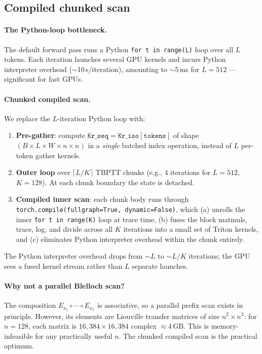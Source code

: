 \documentclass[11pt,a4paper]{article}
\newcommand{\Ex}[1]{E_{#1}}         %
\theoremstyle{plain}
\begin{document}
\subsection{Compiled chunked scan}

\paragraph{The Python-loop bottleneck.}
The default forward pass runs a Python \texttt{for t in range(L)} loop
over all $L$ tokens. Each iteration launches several GPU kernels and
incurs Python interpreter overhead ($\sim$10\,\textmu s/iteration),
amounting to $\sim$5\,ms for $L=512$ --- significant for fast GPUs.

\paragraph{Chunked compiled scan.}
We replace the $L$-iteration Python loop with:
\begin{enumerate}
\item \textbf{Pre-gather}: compute
  $\mathtt{Kr\_seq} = \mathtt{Kr\_iso}[\mathtt{tokens}]$ of shape
  $(B\times L\times W\times n\times n)$ in a \emph{single} batched
  index operation, instead of $L$ per-token gather kernels.
\item \textbf{Outer loop} over $\lceil L/K \rceil$ TBPTT chunks (e.g., 4
  iterations for $L=512$, $K=128$). At each chunk boundary the state is
  detached.
\item \textbf{Compiled inner scan}: each chunk body runs through
  \texttt{torch.compile(fullgraph=True, dynamic=False)}, which (a)
  unrolls the inner \texttt{for t in range(K)} loop at trace time,
  (b) fuses the block matmuls, trace, log, and divide across all $K$
  iterations into a small set of Triton kernels, and (c) eliminates
  Python interpreter overhead within the chunk entirely.
\end{enumerate}
The Python interpreter overhead drops from $\sim L$ to $\sim L/K$
iterations; the GPU sees a fused kernel stream rather than $L$ separate
launches.

\paragraph{Why not a parallel Blelloch scan?}
The composition $\Ex{x_t}\circ\cdots\circ\Ex{x_1}$ is associative, so
a parallel prefix scan exists in principle. However, its elements are
Liouville transfer matrices of size $n^2\times n^2$: for $n=128$, each
matrix is $16{,}384\times 16{,}384$ complex $\approx 4\,\text{GB}$.
This is memory-infeasible for any practically useful $n$. The chunked
compiled scan is the practical optimum.
\end{document}
